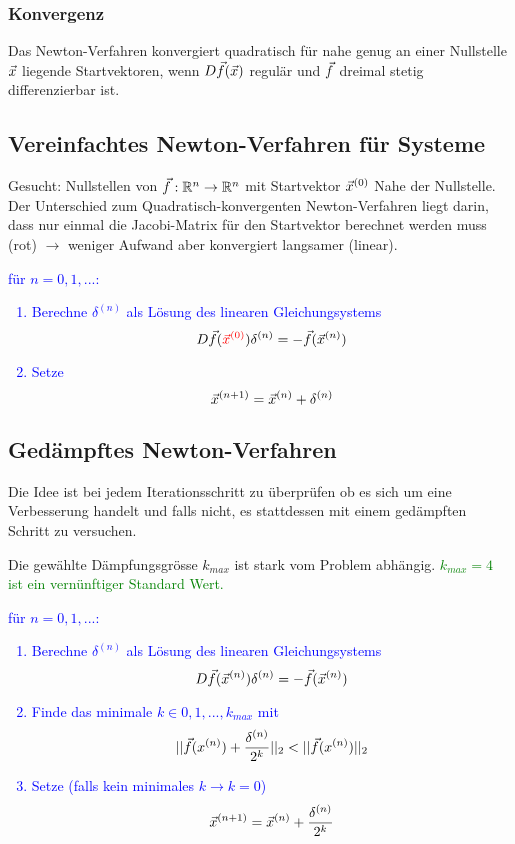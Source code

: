 \subsubsection{Konvergenz}

Das Newton-Verfahren konvergiert quadratisch für nahe genug an einer Nullstelle
$\vec x$ liegende Startvektoren, wenn $D\vec f(\vec x)$ regulär und $\vec f$ dreimal
stetig differenzierbar ist.







\subsection{Vereinfachtes Newton-Verfahren für Systeme}

Gesucht: Nullstellen von $\vec f : \mathbb{R}^n \to \mathbb{R}^n$ mit Startvektor $\vec x^{(0)}$
Nahe der Nullstelle.\\

Der Unterschied zum Quadratisch-konvergenten Newton-Verfahren liegt darin, dass
nur einmal die Jacobi-Matrix für den Startvektor berechnet werden muss (rot)
$\rightarrow$ weniger Aufwand aber konvergiert langsamer (linear).

\textcolor{blue}{
	\Large{
		für $n = 0, 1,...$:
		\begin{enumerate}
			\item Berechne $\delta^{(n)}$ als Lösung des linearen Gleichungsystems
			      $$ D\vec{f}( \textcolor{red}{ \vec x^{(0)} } ) \delta^{(n)} = - \vec f(\vec x^{(n)}) $$
			\item Setze
			      $$ \vec x^{(n+1)} = \vec x^{(n)} + \delta^{(n)} $$
		\end{enumerate}
	}
}



\subsection{Gedämpftes Newton-Verfahren}

Die Idee ist bei jedem Iterationsschritt zu überprüfen ob es sich um eine
Verbesserung handelt und falls nicht, es stattdessen mit einem gedämpften Schritt
zu versuchen.

Die gewählte Dämpfungsgrösse $k_{max}$ ist stark vom Problem abhängig.
\textcolor{green}{$k_{max} = 4$ ist ein vernünftiger Standard Wert.}


\textcolor{blue}{
	\Large{
		für $n = 0, 1,...$:
		\begin{enumerate}
			\item Berechne $\delta^{(n)}$ als Lösung des linearen Gleichungsystems
			      $$ D\vec{f}(\vec x^{(n)}) \delta^{(n)} = - \vec f(\vec x^{(n)}) $$
			\item Finde das minimale $k \in {0,1,...,k_{max}}$ mit
			      $$ || \vec f(x^{(n)}) + \frac{\delta^{(n)}}{2^k} ||_2
				      < || \vec f(x^{(n)}) ||_2  $$
			\item Setze (falls kein minimales $k \rightarrow k = 0$)
			      $$ \vec x^{(n+1)} = \vec x^{(n)} + \frac{ \delta^{(n)} }{ 2^{k} } $$
		\end{enumerate}
	}
}


